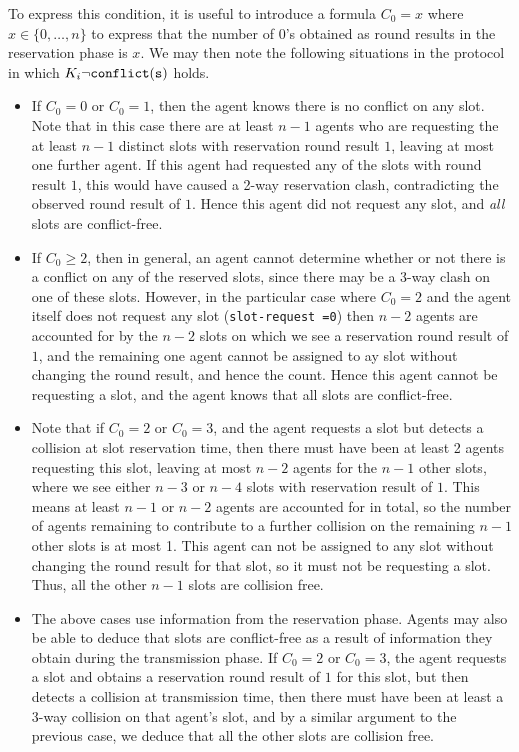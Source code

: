 \documentclass[]{llncs}
\newcommand{\conflict}{\tt conflict}
\begin{document}
To express this condition, it is useful to introduce a formula $C_0 = x$ where $x\in \{0,\ldots,n\}$ 
to express that the number of $0$'s obtained as round results in the reservation phase 
is $x$. We may then note the following situations in the protocol in which $K_i \neg \conflict(s)$
holds. 
\begin{itemize}
\item If $C_0 = 0$ or $C_0 = 1$, 
then the agent knows there is no conflict on any slot. Note that in this case there are at least $n-1$ agents 
who are requesting the at least $n-1$ distinct slots with reservation round result $1$, leaving at most one further agent. 
If this agent had requested any of the slots with round result $1$, this would have caused a 2-way reservation clash, 
contradicting the observed round result of $1$. Hence this agent did not request any slot, 
and {\em all} slots are conflict-free. 

\item If $C_0 \geq 2$, then in general, an agent cannot determine
whether or not there is a conflict on any of the reserved slots, 
since there may be a 3-way clash on one of these slots. 
However, in the particular case where $C_0 = 2$ and the agent itself does not request any slot 
(\verb+slot-request =0+) then $n-2$ agents are accounted for by the $n-2$ slots on which 
we see a reservation round result of $1$, and the remaining one agent cannot be assigned 
to ay slot without changing the round result, and hence the count. Hence this 
agent cannot be requesting a slot, and the agent knows that 
all slots are conflict-free.

\item  
Note that if  $C_0 = 2$ or $C_0=3$, and the agent requests a slot but detects a collision at slot reservation time, then 
there must have been at least 2 agents requesting this slot, leaving at most $n-2$ agents for the $n-1$ other slots,
where we see either $n-3$ or $n-4$ slots with reservation result of $1$. This means at least 
$n-1$ or $n-2$ agents are accounted for in total, so the number of agents remaining to contribute to a further 
collision on the remaining $n-1$ other slots is at most 1. This agent can not be assigned to any slot 
without changing the round result for that slot, so it must not be  requesting a slot. Thus, 
all the other $n-1$ slots are collision free.  

\item
The above cases use information from the reservation phase. 
Agents may also be able to deduce that slots are conflict-free as a result of 
information they obtain during the transmission phase.
 If $C_0 = 2$ or $C_0=3$, the agent requests a slot and obtains a reservation round result of 
$1$ for this slot, but then detects a collision at transmission time, then there must have been at least a 
3-way collision on that agent's slot, and by a similar argument to the 
previous case, we deduce that all the other slots are collision free.  

\end{itemize}
\end{document}
